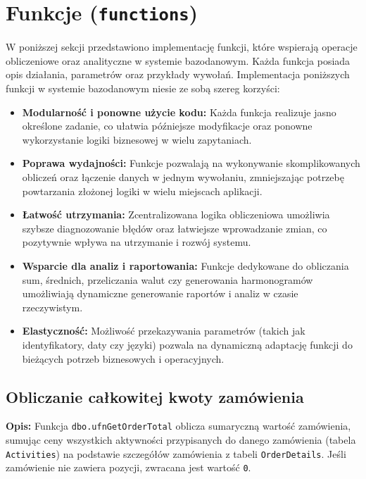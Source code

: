 \documentclass[12pt]{article}
\begin{document}
\section{Funkcje (\texttt{functions})}

W poniższej sekcji przedstawiono implementację funkcji, które wspierają operacje obliczeniowe oraz analityczne w systemie bazodanowym. Każda funkcja posiada opis działania, parametrów oraz przykłady wywołań. Implementacja poniższych funkcji w systemie bazodanowym niesie ze sobą szereg korzyści:

\begin{itemize}
    \item \textbf{Modularność i ponowne użycie kodu:} Każda funkcja realizuje jasno określone zadanie, co ułatwia późniejsze modyfikacje oraz ponowne wykorzystanie logiki biznesowej w wielu zapytaniach.
    \item \textbf{Poprawa wydajności:} Funkcje pozwalają na wykonywanie skomplikowanych obliczeń oraz łączenie danych w jednym wywołaniu, zmniejszając potrzebę powtarzania złożonej logiki w wielu miejscach aplikacji.
    \item \textbf{Łatwość utrzymania:} Zcentralizowana logika obliczeniowa umożliwia szybsze diagnozowanie błędów oraz łatwiejsze wprowadzanie zmian, co pozytywnie wpływa na utrzymanie i rozwój systemu.
    \item \textbf{Wsparcie dla analiz i raportowania:} Funkcje dedykowane do obliczania sum, średnich, przeliczania walut czy generowania harmonogramów umożliwiają dynamiczne generowanie raportów i analiz w czasie rzeczywistym.
    \item \textbf{Elastyczność:} Możliwość przekazywania parametrów (takich jak identyfikatory, daty czy języki) pozwala na dynamiczną adaptację funkcji do bieżących potrzeb biznesowych i operacyjnych.
\end{itemize}



\subsection{Obliczanie całkowitej kwoty zamówienia}
\label{sec:order_total}

\textbf{Opis:} Funkcja \texttt{dbo.ufnGetOrderTotal} oblicza sumaryczną wartość zamówienia, sumując ceny wszystkich aktywności przypisanych do danego zamówienia (tabela \texttt{Activities}) na podstawie szczegółów zamówienia z tabeli \texttt{OrderDetails}. Jeśli zamówienie nie zawiera pozycji, zwracana jest wartość \texttt{0}.
\end{document}
